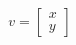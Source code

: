 \documentclass[preview]{standalone}
\begin{document}
\begin{align*}
v = \begin{bmatrix} x \\ y \end{bmatrix}
\end{align*}
\end{document}
